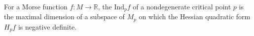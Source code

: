 For a Morse function $f: M \to \mathbb{R}$, the  $\text{Ind}_p f$ of a nondegenerate critical point $p$ is the maximal dimension of a subspace of $M_p$ on which the Hessian quadratic form $H_p f$ is negative definite.
